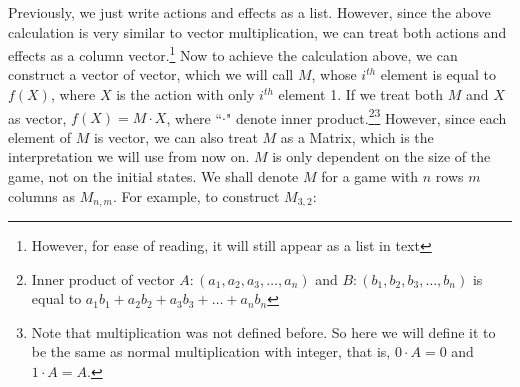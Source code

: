 \documentclass[a4paper, 12pt]{article}
\begin{document}
Previously, we just write actions and effects as a list. However, since the above calculation is very similar to vector multiplication, we can treat both actions and effects as a column vector.\footnote{However, for ease of reading, it will still appear as a list in text} Now to achieve the calculation above, we can construct a vector of vector, which we will call $M$, whose $i^{th}$ element is equal to $f(X)$, where $X$ is the action with only $i^{th}$ element 1. If we treat both $M$ and $X$ as vector, \(f(X) = M\cdot X\), where ``\(\cdot\)" denote inner product.\footnote{Inner product of vector \(A:(a_1, a_2, a_3,\ldots,a_n)\) and \(B:(b_1,b_2,b_3,\ldots,b_n)\) is equal to \(a_1b_1+a_2b_2+a_3b_3+\ldots+a_nb_n\)}\footnote{Note that multiplication was not defined before. So here we will define it to be the same as normal multiplication with integer, that is, $0\cdot A=0$ and $1\cdot A=A$.} However, since each element of $M$ is vector, we can also treat $M$ as a Matrix, which is the interpretation we will use from now on. $M$ is only dependent on the size of the game, not on the initial states. We shall denote $M$ for a game with $n$ rows $m$ columns as $M_{n, m}$. For example, to construct $M_{3,2}$:
\vspace{-1cm}
\end{document}
